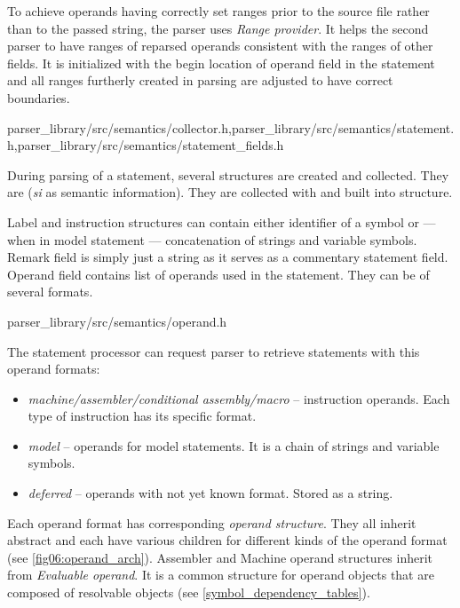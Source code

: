 To achieve operands having correctly set ranges prior to the source file rather than to the passed string, the parser uses \emph{Range provider}. It helps the second parser to have ranges of reparsed operands consistent with the ranges of other fields. It is initialized with the begin location of operand field in the statement and all ranges furtherly created in parsing are adjusted to have correct boundaries.

{parser\_library/src/semantics/collector.h,parser\_library/src/semantics/statement.h,parser\_library/src/semantics/statement\_fields.h}

During parsing of a statement, several structures are created and collected. They are  (\emph{si} as semantic information). They are collected with  and built into  structure.

Label and instruction structures can contain either identifier of a symbol or --- when in model statement --- concatenation of strings and variable symbols. Remark field is simply just a string as it serves as a commentary statement field. Operand field contains list of operands used in the statement. They can be of several formats.

{parser\_library/src/semantics/operand.h}

The statement processor can request parser to retrieve statements with this operand formats:
\begin{itemize}
	\item \emph{machine/assembler/conditional assembly/macro} -- instruction operands. Each type of instruction has its specific format.
	\item \emph{model} -- operands for model statements. It is a chain of strings and variable symbols.
	\item \emph{deferred} -- operands with not yet known format. Stored as a string.
\end{itemize}

Each operand format has corresponding \emph{operand structure}. They all inherit abstract  and each have various children for different kinds of the operand format (see \cref{fig06:operand_arch}). Assembler and Machine operand structures inherit from \emph{Evaluable operand}. It is a common structure for operand objects that are composed of resolvable objects (see \cref{symbol_dependency_tables}).


